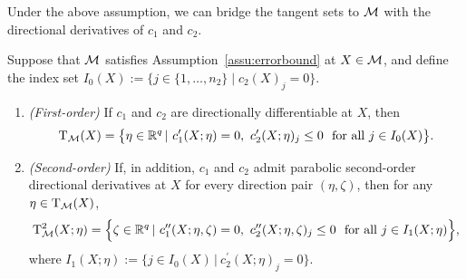 Under the above assumption, we can bridge the tangent sets to $\mathcal{M}$ with the directional derivatives of $c_1$ and $c_2$.
\begin{theorem}\label{the:cal_tangentsets}
Suppose that $\mathcal{M}$ satisfies Assumption~\ref{assu:errorbound} at $X\in\mathcal{M}$, and define the index set $I_0(X):=\{j\in\{1,\dots,n_2\}\mid c_2(X)_j=0\}$.
\begin{enumerate}
\item[\emph{(i)}] \emph{(First-order)} If $c_1$ and $c_2$ are directionally differentiable at $X$, then
\[
\tangent_{\manifold}(X)=\big\{\eta\in\mbR^q\,|\ c_1^\prime(X;\eta)=0,\ c_2^\prime(X;\eta)_j\le 0\ \ \text{for all}\ j\in I_0(X)\big\}.
\]

\item[\emph{(ii)}] \emph{(Second-order)} If, in addition, $c_1$ and $c_2$ admit parabolic second-order directional derivatives at $X$ for every direction pair $(\eta,\zeta)$, then for any $\eta\in\mathrm{T}_{\mathcal{M}}(X)$,
\[
\tangenttwo_{\manifold}(X;\eta)
=\Big\{\zeta\in\mbR^q\,|\ c_1^{\prime\prime}(X;\eta,\zeta)=0,\ c_{2}^{\prime\prime}(X;\eta,\zeta)_j\le 0\ \ \text{for all}\ j\in I_1(X;\eta)\Big\},
\]
where $I_1(X;\eta):=\{j\in I_0(X)\,|\ c_2^{\prime}(X;\eta)_j=0\}$.
\end{enumerate}
\end{theorem}
